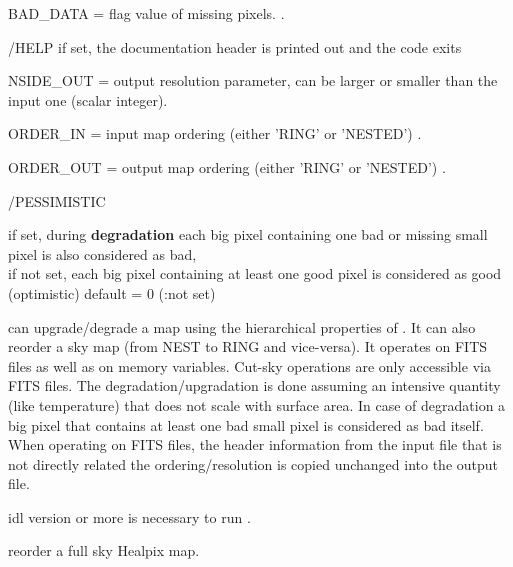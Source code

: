\begin{keywords}
  \begin{kwlist}{} %
    \item[BAD\_DATA =] %
	flag value of missing pixels.
          .
    \item[/HELP] %
	 if set, the documentation header is printed out and the code exits
    \item[NSIDE\_OUT =] %
	 output resolution parameter, can be
    larger or smaller than the input one (scalar integer).
    \item[ORDER\_IN =] %
	input map ordering (either 'RING' or 'NESTED')
	.
    \item[ORDER\_OUT =] %
	output map ordering (either 'RING' or 'NESTED')
	.
    \item[/PESSIMISTIC] %
	\parbox[t]{0.5\hsize}{if set, during {\bf degradation} each big pixel containing one
    bad or missing small pixel is also considered as bad, \\
        if not set, each big pixel containing at least one good pixel
    is considered as good (optimistic)
       default = 0 (:not set)}
  \end{kwlist}
\end{keywords}  

\begin{codedescription}
{\facname can upgrade/degrade a \healpix map using the hierarchical
properties of \healpix. It can also reorder a sky map (from NEST to RING and
vice-versa). It operates on FITS files as well as on memory variables. Cut-sky
operations are only accessible via FITS files.
The degradation/upgradation is done assuming an
intensive quantity (like temperature) that does not scale with surface area. 
In case of degradation a big pixel that contains at least one bad small pixel is
considered as bad itself. When operating on FITS files, the header information
from the input file that is not directly related the ordering/resolution is
copied unchanged into the output file.}
\end{codedescription}



\begin{related}
  \begin{sulist}{} %
    \item[idl] version \idlversion or more is necessary to run \facname.
    \item[\htmlref{reorder}{idl:reorder}] reorder a full sky Healpix map.
  \end{sulist}
\end{related}

